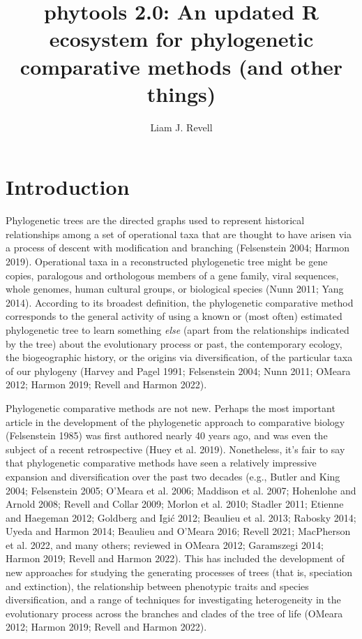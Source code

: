 \documentclass[fleqn,10pt,lineno]{wlpeerj} %
\title{phytools 2.0: An updated R ecosystem for phylogenetic comparative methods (and other things)}
\author[1, 2]{Liam J. Revell}
\affil[1]{Department of Biology, University of Massachusetts Boston, Boston, MA, USA}
\affil[2]{Facultad de Ciencias, Universidad Católica de la Santísima Concepción, Concepción, Chile}
\begin{document}
\flushbottom
\maketitle
\thispagestyle{empty}

\hypertarget{introduction}{%
\section{Introduction}\label{introduction}}

Phylogenetic trees are the directed graphs used to represent historical relationships among a set of operational taxa that are thought to have arisen via a process of descent with modification and branching (Felsenstein 2004; Harmon 2019). Operational taxa in a reconstructed phylogenetic tree might be gene copies, paralogous and orthologous members of a gene family, viral sequences, whole genomes, human cultural groups, or biological species (Nunn 2011; Yang 2014). According to its broadest definition, the phylogenetic comparative method corresponds to the general activity of using a known or (most often) estimated phylogenetic tree to learn something \emph{else} (apart from the relationships indicated by the tree) about the evolutionary process or past, the contemporary ecology, the biogeographic history, or the origins via diversification, of the particular taxa of our phylogeny (Harvey and Pagel 1991; Felsenstein 2004; Nunn 2011; OMeara 2012; Harmon 2019; Revell and Harmon 2022).

Phylogenetic comparative methods are not new. Perhaps the most important article in the development of the phylogenetic approach to comparative biology (Felsenstein 1985) was first authored nearly 40 years ago, and was even the subject of a recent retrospective (Huey et al. 2019). Nonetheless, it's fair to say that phylogenetic comparative methods have seen a relatively impressive expansion and diversification over the past two decades (e.g., Butler and King 2004; Felsenstein 2005; O'Meara et al. 2006; Maddison et al. 2007; Hohenlohe and Arnold 2008; Revell and Collar 2009; Morlon et al. 2010; Stadler 2011; Etienne and Haegeman 2012; Goldberg and Igić 2012; Beaulieu et al. 2013; Rabosky 2014; Uyeda and Harmon 2014; Beaulieu and O'Meara 2016; Revell 2021; MacPherson et al. 2022, and many others; reviewed in OMeara 2012; Garamszegi 2014; Harmon 2019; Revell and Harmon 2022). This has included the development of new approaches for studying the generating processes of trees (that is, speciation and extinction), the relationship between phenotypic traits and species diversification, and a range of techniques for investigating heterogeneity in the evolutionary process across the branches and clades of the tree of life (OMeara 2012; Harmon 2019; Revell and Harmon 2022).
\end{document}
